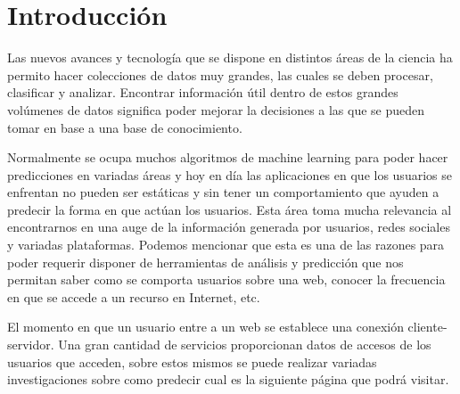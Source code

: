 \chapter[Introducción]{Introducción}
\label{ch:intro}

{
	Las nuevos avances y tecnología que se dispone en distintos áreas de la ciencia ha permito hacer colecciones de datos muy grandes, las cuales se deben procesar, clasificar y analizar. Encontrar información útil dentro de estos grandes volúmenes de datos significa poder mejorar la decisiones a las que se pueden tomar en base a una base de conocimiento.
	
	
	Normalmente se ocupa muchos algoritmos de machine learning para poder hacer predicciones en variadas áreas y  hoy en día las aplicaciones en que los usuarios se enfrentan no pueden ser estáticas y sin tener un comportamiento que ayuden a predecir la forma en que actúan los usuarios. Esta área toma mucha relevancia al encontrarnos en una auge de la información generada por usuarios, redes sociales y variadas plataformas. Podemos mencionar que esta es una de las razones para poder requerir disponer de herramientas de análisis y predicción que nos permitan saber como se comporta usuarios sobre una web, conocer la frecuencia en que se accede a un recurso en Internet, etc.
  
  El momento en que un usuario entre a un web se establece una conexión cliente-servidor. Una gran cantidad de servicios proporcionan datos de accesos de los usuarios que acceden, sobre estos mismos se puede realizar variadas investigaciones sobre como predecir cual es la siguiente página que podrá visitar.
  }


